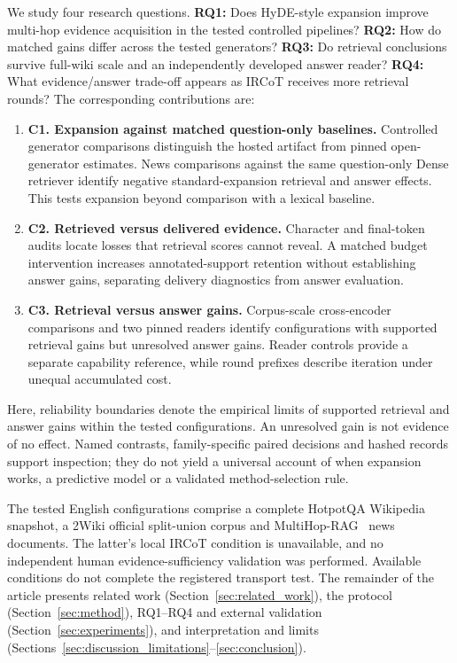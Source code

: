 We study four research questions. \textbf{RQ1:} Does HyDE-style expansion improve multi-hop evidence acquisition in the tested controlled pipelines? \textbf{RQ2:} How do matched gains differ across the tested generators? \textbf{RQ3:} Do retrieval conclusions survive full-wiki scale and an independently developed answer reader? \textbf{RQ4:} What evidence/answer trade-off appears as IRCoT receives more retrieval rounds? The corresponding contributions are:
\begin{enumerate}
\item \textbf{C1. Expansion against matched question-only baselines.} Controlled generator comparisons distinguish the hosted artifact from pinned open-generator estimates. News comparisons against the same question-only Dense retriever identify negative standard-expansion retrieval and answer effects. This tests expansion beyond comparison with a lexical baseline.
\item \textbf{C2. Retrieved versus delivered evidence.} Character and final-token audits locate losses that retrieval scores cannot reveal. A matched budget intervention increases annotated-support retention without establishing answer gains, separating delivery diagnostics from answer evaluation.
\item \textbf{C3. Retrieval versus answer gains.} Corpus-scale cross-encoder comparisons and two pinned readers identify configurations with supported retrieval gains but unresolved answer gains. Reader controls provide a separate capability reference, while round prefixes describe iteration under unequal accumulated cost.
\end{enumerate}

Here, reliability boundaries denote the empirical limits of supported retrieval and answer gains within the tested configurations. An unresolved gain is not evidence of no effect. Named contrasts, family-specific paired decisions and hashed records support inspection; they do not yield a universal account of when expansion works, a predictive model or a validated method-selection rule.

The tested English configurations comprise a complete HotpotQA Wikipedia snapshot, a 2Wiki official split-union corpus and MultiHop-RAG~\cite{tang2024multihoprag} news documents. The latter's local IRCoT condition is unavailable, and no independent human evidence-sufficiency validation was performed. Available conditions do not complete the registered transport test. The remainder of the article presents related work (Section~\ref{sec:related_work}), the protocol (Section~\ref{sec:method}), RQ1--RQ4 and external validation (Section~\ref{sec:experiments}), and interpretation and limits (Sections~\ref{sec:discussion_limitations}--\ref{sec:conclusion}).
